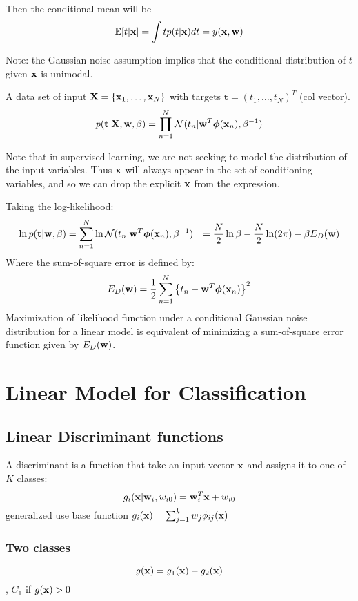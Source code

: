 Then the conditional mean will be 
\begin{equation}
    \mathbb{E}[t|\mathbf{x}] = \int t p(t|\mathbf{x}) dt = y(\mathbf{x}, \mathbf{w})
\end{equation}

Note: the Gaussian noise assumption implies that the conditional
distribution of $t$ given $\mathbf{x}$ is unimodal.

A data set of input $\mathbf{X} = \left\{ \mathbf{x}_1, \dots, \mathbf{x}_N \right\}$
with targets $\mathbf{t}=(t_1, \dots, t_N)^T$ (col vector). 
\begin{equation}
    p(\mathbf{t}|\mathbf{X}, \mathbf{w}, \beta)= \prod_{n=1}^N \mathcal{N}(t_n|\mathbf{w}^T
    \boldsymbol\phi(\mathbf{x}_n), \beta^{-1})
\end{equation}

Note that in supervised learning, we are not seeking to model the
distribution of the input variables. Thus $\mathbf{x}$ will always appear in the
set of conditioning variables, and so we can drop the explicit $\mathbf{x}$ from
the expression.

Taking the log-likelihood:
\begin{align}
    \ln p(\mathbf{t}| \mathbf{w}, \beta) &= \sum_{n=1}^N \ln
    \mathcal{N}(t_n|\mathbf{w}^T\boldsymbol\phi(\mathbf{x}_n), \beta^{-1})
    &=\frac{N}{2} \ln \beta - \frac{N}{2}\ln(2\pi) - \beta E_D(\mathbf{w})
\end{align}
Where the sum-of-square error is defined by:
\begin{equation}
    E_D(\mathbf{w}) = \frac{1}{2}\sum_{n=1}^N \left\{ t_n - \mathbf{w}^T
    \boldsymbol\phi(\mathbf{x}_n) \right\}^2
\end{equation}
Maximization of likelihood function under a conditional Gaussian noise
distribution for a linear model is equivalent of minimizing a
sum-of-square error function given by $E_D(\mathbf{w})$.

\chapter{Linear Model for Classification}
\section{Linear Discriminant functions}
A discriminant is a function that take an input vector $\mathbf{x}$ and assigns
it to one of $K$ classes:
\[g_i(\mathbf{x}|\mathbf{w}_i, w_{i0}) =\mathbf{w}_i^T\mathbf{x} + w_{i0}\] generalized use base
function $g_i(\mathbf{x}) = \sum_{j=1}^k w_j \phi_{ij}(\mathbf{x})$
\subsection{Two classes}
\[g(\mathbf{x}) = g_1(\mathbf{x}) - g_2(\mathbf{x}) \], $C_1$ if $g(\mathbf{x})>0$


